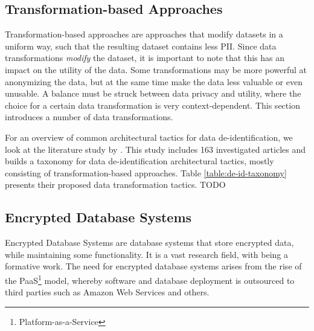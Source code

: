 \subsection{Transformation-based Approaches}
\label{sec:transformation-approaches}
Transformation-based approaches are approaches that modify datasets in a uniform way, such that the resulting dataset contains less \gls{PII}. Since data transformations \textit{modify} the dataset, it is important to note that this has an impact on the utility of the data. Some transformations may be more powerful at anonymizing the data, but at the same time make the data less valuable or even unusable. A balance must be struck between data privacy and utility, where the choice for a certain data transformation is very context-dependent. This section introduces a number of data transformations.

For an overview of common architectural tactics for data de-identification, we look at the literature study by \citeauthor{de-id-taxonomy}. This study includes 163 investigated articles and builds a taxonomy for data de-identification architectural tactics, mostly consisting of transformation-based approaches. Table \ref{table:de-id-taxonomy} presents their proposed data transformation tactics.
\newpage
TODO

\subsection{Encrypted Database Systems}
Encrypted Database Systems are database systems that store encrypted data, while maintaining some functionality. It is a vast research field, with \citet{sok-cryptdb} being a formative work. The need for encrypted database systems arises from the rise of the PaaS\footnote{Platform-as-a-Service} model, whereby software and database deployment is outsourced to third parties such as Amazon Web Services and others. 

